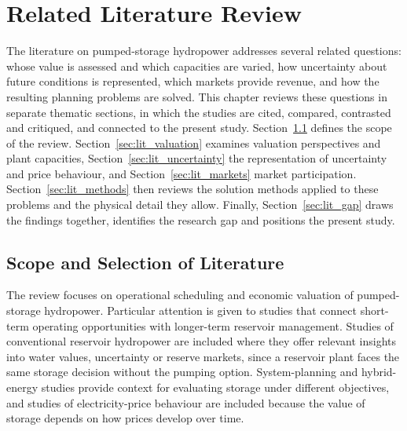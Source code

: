 
\section{Related Literature Review}
\label{sec:literature}

The literature on pumped-storage hydropower addresses several related
questions: whose value is assessed and which capacities are varied, how
uncertainty about future conditions is represented, which markets
provide revenue, and how the resulting planning problems are solved.
This chapter reviews these questions in separate thematic sections, in
which the studies are cited, compared, contrasted and critiqued, and
connected to the present study. Section~\ref{sec:lit_scope} defines the
scope of the review. Section~\ref{sec:lit_valuation} examines valuation
perspectives and plant capacities, Section~\ref{sec:lit_uncertainty} the
representation of uncertainty and price behaviour, and
Section~\ref{sec:lit_markets} market participation.
Section~\ref{sec:lit_methods} then reviews the solution methods applied
to these problems and the physical detail they allow. Finally,
Section~\ref{sec:lit_gap} draws the findings together, identifies the
research gap and positions the present study.

\subsection{Scope and Selection of Literature}
\label{sec:lit_scope}

The review focuses on operational scheduling and economic valuation of
pumped-storage hydropower. Particular attention is given to studies that
connect short-term operating opportunities with longer-term reservoir
management. Studies of conventional reservoir hydropower are included
where they offer relevant insights into water values, uncertainty or
reserve markets, since a reservoir plant faces the same storage decision
without the pumping option. System-planning and hybrid-energy studies
provide context for evaluating storage under different objectives, and
studies of electricity-price behaviour are included because the value
of storage depends on how prices develop over time.

